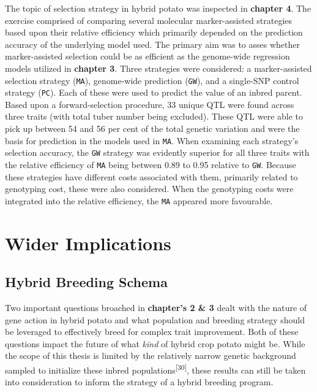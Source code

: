 The topic of selection strategy in hybrid potato was inspected in
\textbf{chapter 4}. The exercise comprised of comparing several
molecular marker-assisted strategies based upon their relative
efficiency which primarily depended on the prediction accuracy of the
underlying model used. The primary aim was to asses whether
marker-assisted selection could be as efficient as the genome-wide
regression models utilized in \textbf{chapter 3}. Three strategies were
considered: a marker-assisted selection strategy (\texttt{MA}),
genome-wide prediction (\texttt{GW}), and a single-SNP control strategy
(\texttt{PC}). Each of these were used to predict the value of an inbred
parent. Based upon a forward-selection procedure, 33 unique QTL were
found across three traits (with total tuber number being excluded).
These QTL were able to pick up between 54 and 56 per cent of the total
genetic variation and were the basis for prediction in the models used
in \texttt{MA}. When examining each strategy's selection accuracy, the
\texttt{GW} strategy was evidently superior for all three traits with
the relative efficiency of \texttt{MA} being between 0.89 to 0.95
relative to \texttt{GW}. Because these strategies have different costs
associated with them, primarily related to genotyping cost, these were
also considered. When the genotyping costs were integrated into the
relative efficiency, the \texttt{MA} appeared more favourable.

\section{Wider Implications}\label{wider-implications}

\subsection{Hybrid Breeding Schema}\label{hybrid-breeding-schema}

Two important questions broached in \textbf{chapter's 2 \& 3} dealt with
the nature of gene action in hybrid potato and what population and
breeding strategy should be leveraged to effectively breed for complex
trait improvement. Both of these questions impact the future of what
\emph{kind} of hybrid crop potato might be. While the scope of this
thesis is limited by the relatively narrow genetic background sampled to
initialize these inbred populations\textsuperscript{{[}30{]}}, these
results can still be taken into consideration to inform the strategy of
a hybrid breeding program.

